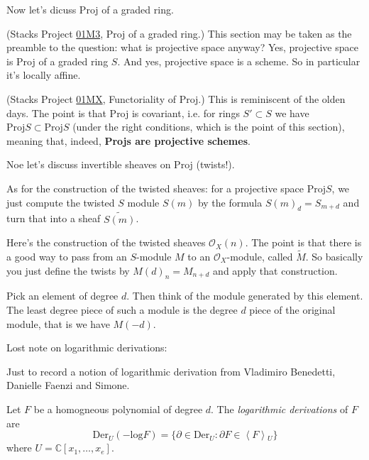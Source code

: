 \medskip\noindent
Now let's dicuss Proj of a graded ring.

\noindent
(Stacks Project
\href{https://stacks.math.columbia.edu/tag/%
01M3}{01M3},
Proj of a graded ring.)
This section may be taken as the preamble to
the question: what is projective space
anyway?
Yes, projective space is Proj of a graded
ring $S$.
And yes, projective space is a scheme.
So in particular it's locally affine.

(Stacks Project
\href{https://stacks.math.columbia.edu/tag/%
01MX}{01MX},
Functoriality of Proj.)
This is reminiscent of the olden days.
The point is that Proj is covariant,
i.e. for rings  $S' \subset S$ we have
$\text{Proj}S \subset \text{Proj}S$
(under the right conditions,
which is the point of this section),
meaning that, indeed,
{\bf Projs are projective schemes}.






\medskip\noindent
Noe let's discuss invertible sheaves on Proj
(twists!).

\noindent
As for the construction of the twisted
sheaves:
for a projective space $\text{Proj} S$,
we just compute the twisted $S$ module
$S(m)$ by the formula $S(m)_d=S_{m+d}$
and turn that into a sheaf
$\widetilde{S(m)}$.

Here's the construction of the twisted
sheaves $\mathcal{O}_X(n)$.
The point is that there is a good way
to pass from an $S$-module $M$ to an
$\mathcal{O}_X$-module, called
$\widetilde{M}$.
So basically you just define the twists
by $M(d)_n=M_{n+d}$ and apply that
construction.

Pick an element of degree $d$.
Then think of the module generated by this
element.
The least degree piece of such a module
is the degree $d$ piece of the original
module,
that is we have $M(-d)$.











\medskip\noindent
Lost note on logarithmic derivations:

\noindent
Just to record a notion of logarithmic
derivation
from Vladimiro Benedetti, Danielle Faenzi and
Simone.

Let $F$ be a homogneous polynomial of degree
$d$.
The {\it logarithmic derivations} of $F$ are
$$
\text{Der}_U(-\text{log}F)
=\{\partial \in \text{Der}_U
:\partial F \in \left\langle{}F\right\rangle{}_U\}
$$
where $U=\mathbb{C}[x_1,…,x_e]$.










